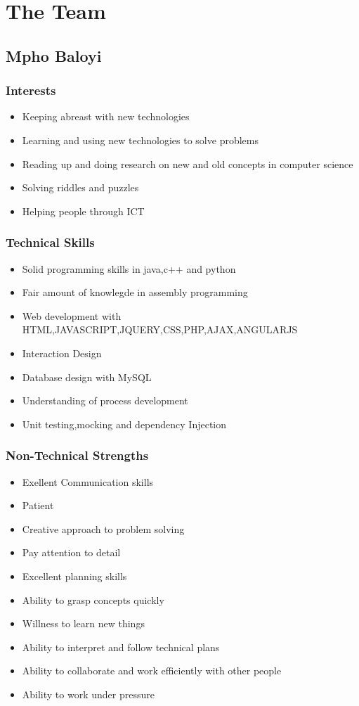 \documentclass[a4paper,12pt]{article}
\begin{document}
\newpage
\newpage
\tableofcontents
\section{The Team}
\subsection{Mpho Baloyi}
\subsubsection{Interests}
\begin{itemize}
\item Keeping abreast with new technologies
\item Learning and using new technologies to solve problems
\item Reading up and doing research on new and old concepts in computer science
\item Solving riddles and puzzles
\item Helping people through ICT
\end{itemize}
\subsubsection{Technical Skills}
\begin{itemize}
\item Solid programming skills in java,c++ and python
\item Fair amount of knowlegde in assembly programming
\item Web development with HTML,JAVASCRIPT,JQUERY,CSS,PHP,AJAX,ANGULARJS
\item Interaction Design
\item Database design with MySQL
\item Understanding of process development
\item Unit testing,mocking and dependency Injection
\end{itemize}
\subsubsection{Non-Technical Strengths}
\begin{itemize}
\item Exellent Communication skills
\item Patient
\item Creative approach to problem solving
\item Pay attention to detail
\item Excellent planning skills
\item Ability to grasp concepts quickly
\item Willness to learn new things
\item Ability to interpret and follow technical plans
\item Ability to collaborate and work efficiently with other people
\item Ability to work under pressure
\end{itemize}
\end{document}
